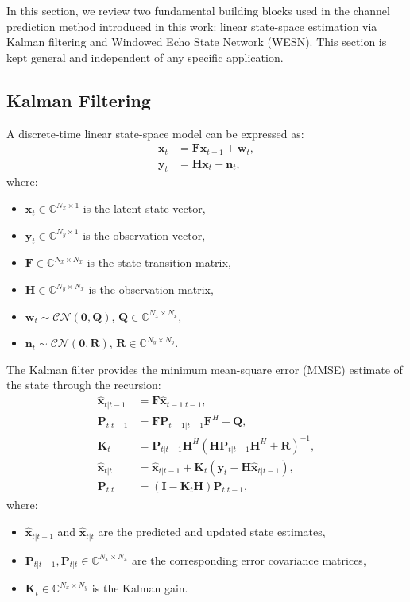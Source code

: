 \documentclass[lettersize,journal]{IEEEtran}
\begin{document}
In this section, we review two fundamental building blocks used in the channel prediction method introduced in this work: linear state-space estimation via Kalman filtering and Windowed Echo State Network (WESN). This section is kept general and independent of any specific application.

\subsection{Kalman Filtering}

A discrete-time linear state-space model can be expressed as:
\begin{align}
\mathbf{x}_t &= \mathbf{F} \mathbf{x}_{t-1} + \mathbf{w}_t, \\
\mathbf{y}_t &= \mathbf{H} \mathbf{x}_t + \mathbf{n}_t,
\end{align}
where:
\begin{itemize}
    \item $\mathbf{x}_t \in \mathbb{C}^{N_x \times 1}$ is the latent state vector,
    \item $\mathbf{y}_t \in \mathbb{C}^{N_y \times 1}$ is the observation vector,
    \item $\mathbf{F} \in \mathbb{C}^{N_x \times N_x}$ is the state transition matrix,
    \item $\mathbf{H} \in \mathbb{C}^{N_y \times N_x}$ is the observation matrix,
    \item $\mathbf{w}_t \sim \mathcal{CN}(\mathbf{0}, \mathbf{Q})$, $\mathbf{Q} \in \mathbb{C}^{N_x \times N_x}$,
    \item $\mathbf{n}_t \sim \mathcal{CN}(\mathbf{0}, \mathbf{R})$, $\mathbf{R} \in \mathbb{C}^{N_y \times N_y}$.
\end{itemize}

The Kalman filter provides the minimum mean-square error (MMSE) estimate of the state through the recursion:
\begin{align}
\hat{\mathbf{x}}_{t|t-1} &= \mathbf{F} \hat{\mathbf{x}}_{t-1|t-1}, \\
\mathbf{P}_{t|t-1} &= \mathbf{F} \mathbf{P}_{t-1|t-1} \mathbf{F}^H + \mathbf{Q}, \\
\mathbf{K}_t &= \mathbf{P}_{t|t-1} \mathbf{H}^H \left( \mathbf{H} \mathbf{P}_{t|t-1} \mathbf{H}^H + \mathbf{R} \right)^{-1}, \\
\hat{\mathbf{x}}_{t|t} &= \hat{\mathbf{x}}_{t|t-1} + \mathbf{K}_t \left( \mathbf{y}_t - \mathbf{H} \hat{\mathbf{x}}_{t|t-1} \right), \\
\mathbf{P}_{t|t} &= \left( \mathbf{I} - \mathbf{K}_t \mathbf{H} \right) \mathbf{P}_{t|t-1},
\end{align}
where:
\begin{itemize}
    \item $\hat{\mathbf{x}}_{t|t-1}$ and $\hat{\mathbf{x}}_{t|t}$ are the predicted and updated state estimates,
    \item $\mathbf{P}_{t|t-1}, \mathbf{P}_{t|t} \in \mathbb{C}^{N_x \times N_x}$ are the corresponding error covariance matrices,
    \item $\mathbf{K}_t \in \mathbb{C}^{N_x \times N_y}$ is the Kalman gain.
\end{itemize}
\end{document}
